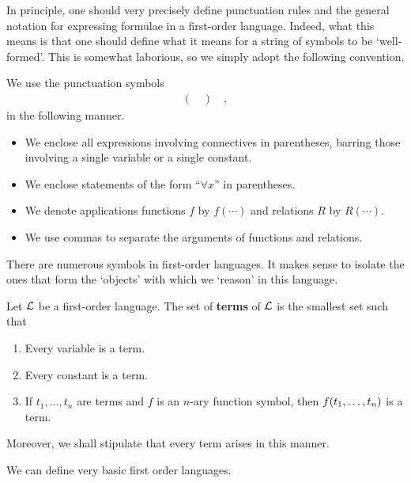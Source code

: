 In principle, one should very precisely define punctuation rules and the general notation for expressing formulae in a first-order language. Indeed, what this means is that one should define what it means for a string of symbols to be `well-formed'. This is somewhat laborious, so we simply adopt the following convention.

\begin{boxconvention}
    We use the punctuation symbols
    \begin{align*}
        ( \quad ) \quad ,
    \end{align*}
    in the following manner.
    \begin{itemize}
        \item We enclose all expressions involving connectives in parentheses, barring those involving a single variable or a single constant.
        \item We enclose statements of the form ``$\forall x$'' in parentheses.
        \item We denote applications functions $f$ by $f(\cdots)$ and relations $R$ by $R(\cdots)$.
        \item We use commas to separate the arguments of functions and relations.
    \end{itemize}
\end{boxconvention}

There are numerous symbols in first-order languages. It makes sense to isolate the ones that form the `objects' with which we `reason' in this language.

\begin{boxdefinition}[Terms]
    Let $\mathcal{L}$ be a first-order language. The set of \textbf{terms} of $\mathcal{L}$ is the smallest set such that
    \begin{enumerate}
        \item Every variable is a term.
        \item Every constant is a term.
        \item If $t_1, \ldots, t_n$ are terms and $f$ is an $n$-ary function symbol, then $f\!\left( t_1, \ldots, t_n \right)$ is a term.
    \end{enumerate}
    Moreover, we shall stipulate that every term arises in this manner.
\end{boxdefinition}

We can define very basic first order languages.

